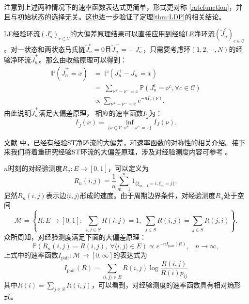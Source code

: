 注意到上述两种情况下的速率函数表达式更简单，形式更对称 \eqref{ratefunction}，并且与初始状态的选择无关。这也进一步验证了定理\ref{thm:LDP}的相关结论。

LE经验环流$(J^{c}_n)_{c\in\mathcal{C}}$的大偏差原理结果可以直接应用到经验LE净环流$(\tilde{J}^{c}_n)_{c\in\mathcal{C}}$。对一状态和两状态马氏链$\tilde{J}^c_n = 0$且$\tilde{J}^+_n = -\ {J}^-_n$，只需要考虑环$(1, 2, \cdots ,N)$的经验净环流$\tilde{J}^+_n$。那么由收缩原理可以得到：
\begin{equation}\label{tilde I J}
	\begin{split}
		\mathbb{P}\left(\tilde{J}^{+}_n = x\right)
		&=\;\mathbb{P}\left(J^{+}_n-J^{-}_n = x\right)\\
		&=\;\sum_{\nu^{+}-\nu^{-}=x}\mathbb{P}\left(J^{c}_n=\nu^{c},\forall c\in\mathcal{C}\right)\\
		&\propto\sum_{\nu^{+}-\nu^{-}=x} e^{-nI_J(\nu)}.
	\end{split}
\end{equation}
由此说明$\tilde{J}^+_n$满足大偏差原理， 相应的速率函数$I_{\tilde{J}}$为：
\begin{equation*}
	I_{\tilde{J}}(x)=\inf_{\{\nu\in\mathcal{V}:\nu^{+}-\nu^{-}= x\}}I_J(\nu).
\end{equation*} 


文献 \cite{bertini2015flows} 中，已经有经验ST净环流的大偏差，和速率函数的对称性的相关介绍。接下来我们将着重研究经验ST环流的大偏差原理，涉及对经验测度内容可参考 \cite{den2000large}。

$n$时刻的对经验测度$R_n:E\rightarrow[0,1]$，可以定义为
\begin{equation*}
R_n(i,j) = \frac{1}{n}\sum_{m=1}^n1_{\{\xi_{m-1}=i,\xi_m=j\}},
\end{equation*}
显然$R_n(i,j)$表示边$\langle i,j\rangle$形成的速度。由于周期边界条件，对经验测度$R_n$处于空间
\begin{equation*}
\mathcal{M} = \left\{R:E\rightarrow[0,1]:\;\sum_{i,j\in S}R(i,j) = 1,\;
\sum_{j\in S}R(i,j)=\sum_{j\in S}R(j,i)\right\}.
\end{equation*}
众所周知，对经验测度满足下面的大偏差原理：
\begin{equation*}
\mathbb{P}(R_n(i,j)=R(i,j),\;\forall\langle i,j\rangle\in E)\propto e^{-nI_{\mathrm{pair}}(R)},\;\;\;n\to\infty,
\end{equation*}
上式中的速率函数$I_{\mathrm{pair}}:\mathcal{M}\rightarrow[0,\infty]$的表达式为
\begin{equation*}
I_{\mathrm{pair}}(R) = \sum_{\langle i,j\rangle\in E}R(i,j)\log\frac{R(i,j)}{R(i)p_{ij}}
\end{equation*}
其中$R(i)=\sum_{j\in S}R(i,j)$，可以看到，对经验测度的速率函数具有相对熵形式。


